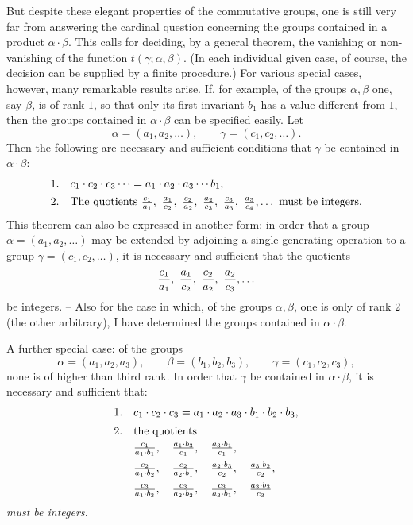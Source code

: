 \documentclass[11pt,a4paper]{article}
\begin{document}
But despite these elegant properties of the commutative groups, one is still very far from answering the cardinal question concerning the groups contained in a product $\alpha\cdot\beta$. This calls for deciding, by a general theorem, the vanishing or non-vanishing of the function $t(\gamma;\alpha,\beta)$. (In each individual given case, of course, the decision can be supplied by a finite procedure.) For various special cases, however, many remarkable results arise. If, for example, of the groups $\alpha,\beta$ one, say $\beta$, is of rank $1$, so that only its first invariant $b_1$ has a value different from $1$, then the groups contained in $\alpha\cdot\beta$ can be specified easily. Let
\[
 \alpha=(a_1,a_2,\ldots),\qquad \gamma=(c_1,c_2,\ldots).
\]
Then the following are necessary and sufficient conditions that $\gamma$ be contained in $\alpha\cdot\beta$:
\[
\begin{array}{ll}
1. & c_1\cdot c_2\cdot c_3\cdots=a_1\cdot a_2\cdot a_3\cdots b_1,\\[0.4em]
2. & \text{The quotients } {c_1\over a_1},\ {a_1\over c_2},\ {c_2\over a_2},\ {a_2\over c_3},\ {c_3\over a_3},\ {a_3\over c_4},\ldots\text{ must be integers.}
\end{array}
\]
This theorem can also be expressed in another form: in order that a group $\alpha=(a_1,a_2,\ldots)$ may be extended by adjoining a single generating operation to a group $\gamma=(c_1,c_2,\ldots)$, it is necessary and sufficient that the quotients
\[
 {c_1\over a_1},\ {a_1\over c_2},\ {c_2\over a_2},\ {a_2\over c_3},\ldots
\]
be integers. -- Also for the case in which, of the groups $\alpha,\beta$, one is only of rank $2$ (the other arbitrary), I have determined the groups contained in $\alpha\cdot\beta$.

A further special case: of the groups
\[
 \alpha=(a_1,a_2,a_3),\qquad
 \beta=(b_1,b_2,b_3),\qquad
 \gamma=(c_1,c_2,c_3),
\]
none is of higher than third rank. In order that $\gamma$ be contained in $\alpha\cdot\beta$, it is necessary and sufficient that:
\[
\begin{array}{ll}
1. & c_1\cdot c_2\cdot c_3=a_1\cdot a_2\cdot a_3\cdot b_1\cdot b_2\cdot b_3,\\[0.5em]
2. & \text{the quotients}\\[0.2em]
& {c_1\over a_1\cdot b_1},\quad {a_1\cdot b_3\over c_1},\quad {a_3\cdot b_1\over c_1},\\[0.6em]
& {c_2\over a_1\cdot b_2},\quad {c_2\over a_2\cdot b_1},\quad {a_2\cdot b_3\over c_2},\quad {a_3\cdot b_2\over c_2},\\[0.6em]
& {c_3\over a_1\cdot b_3},\quad {c_3\over a_2\cdot b_2},\quad {c_3\over a_3\cdot b_1},\quad {a_3\cdot b_3\over c_3}
\end{array}
\]
\emph{must be integers.}
\end{document}

